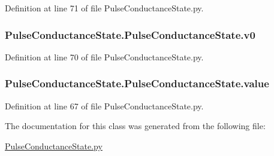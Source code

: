 Definition at line 71 of file Pulse\+Conductance\+State.\+py.

\subsubsection[{\texorpdfstring{v0}{v0}}]{\setlength{\rightskip}{0pt plus 5cm}Pulse\+Conductance\+State.\+Pulse\+Conductance\+State.\+v0}\hypertarget{class_pulse_conductance_state_1_1_pulse_conductance_state_a215539a3eb60e280225053c83f386d79}{}\label{class_pulse_conductance_state_1_1_pulse_conductance_state_a215539a3eb60e280225053c83f386d79}


Definition at line 70 of file Pulse\+Conductance\+State.\+py.

\subsubsection[{\texorpdfstring{value}{value}}]{\setlength{\rightskip}{0pt plus 5cm}Pulse\+Conductance\+State.\+Pulse\+Conductance\+State.\+value}\hypertarget{class_pulse_conductance_state_1_1_pulse_conductance_state_a832cdff7f315b8c16bef00642fb385dd}{}\label{class_pulse_conductance_state_1_1_pulse_conductance_state_a832cdff7f315b8c16bef00642fb385dd}


Definition at line 67 of file Pulse\+Conductance\+State.\+py.



The documentation for this class was generated from the following file\+:\begin{DoxyCompactItemize}
\item 
\hyperlink{_pulse_conductance_state_8py}{Pulse\+Conductance\+State.\+py}\end{DoxyCompactItemize}
